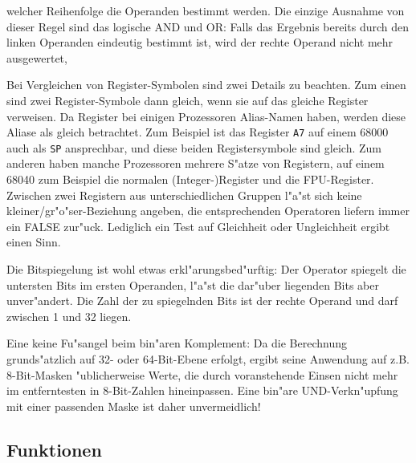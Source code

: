 \documentclass[12pt,a4paper,twoside]{report}
\begin{document}
welcher Reihenfolge die Operanden bestimmt werden.  Die einzige Ausnahme
von dieser Regel sind das logische AND und OR: Falls das Ergebnis bereits
durch den linken Operanden eindeutig bestimmt ist, wird der rechte
Operand nicht mehr ausgewertet,
\par
Bei Vergleichen von Register-Symbolen sind zwei Details zu beachten.
Zum einen sind zwei Register-Symbole dann gleich, wenn sie auf das
gleiche Register verweisen.  Da Register bei einigen Prozessoren
Alias-Namen haben, werden diese Aliase als gleich betrachtet.  Zum
Beispiel ist das Register {\tt A7} auf einem 68000 auch als {\tt SP}
ansprechbar, und diese beiden Registersymbole sind gleich.  Zum anderen
haben manche Prozessoren mehrere S"atze von Registern, auf einem 68040
zum Beispiel die normalen (Integer-)Register und die FPU-Register.
Zwischen zwei Registern aus unterschiedlichen Gruppen l"a"st sich
keine kleiner/gr"o"ser-Beziehung angeben, die entsprechenden Operatoren
liefern immer ein FALSE zur"uck.  Lediglich ein Test auf Gleichheit oder
Ungleichheit ergibt einen Sinn.
\par
Die Bitspiegelung ist wohl etwas erkl"arungsbed"urftig: Der Operator
spiegelt die untersten Bits im ersten Operanden, l"a"st die
dar"uber liegenden Bits aber unver"andert.  Die Zahl der zu spiegelnden
Bits ist der rechte Operand und darf zwischen 1 und 32 liegen.
\par
Eine keine Fu"sangel beim bin"aren Komplement: Da die Berechnung
grunds"atzlich auf 32- oder 64-Bit-Ebene erfolgt, ergibt seine Anwendung
auf z.B. 8-Bit-Masken "ublicherweise Werte, die durch voranstehende
Einsen nicht mehr im entferntesten in 8-Bit-Zahlen hineinpassen.  Eine
bin"are UND-Verkn"upfung mit einer passenden Maske ist daher unvermeidlich!

\subsection{Funktionen}
\end{document}
